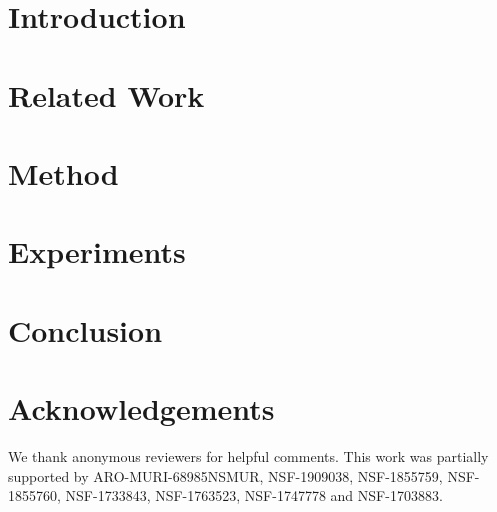 \documentclass[10pt,twocolumn,letterpaper]{article}
\theoremstyle{definition}
\begin{document}

\vspace{-1em}
\section{Introduction}
\label{sec:intro}


\section{Related Work}
\label{sec:related-work}


\section{Method}
\label{sec:method}


\section{Experiments}
\label{sec:exp}


\section{Conclusion}
\label{sec:conclude}



\section*{Acknowledgements}
We thank anonymous reviewers for helpful comments. This work was partially supported by ARO-MURI-68985NSMUR, NSF-1909038, NSF-1855759, NSF-1855760, NSF-1733843, NSF-1763523, NSF-1747778 and NSF-1703883.

{\small


}


\end{document}
